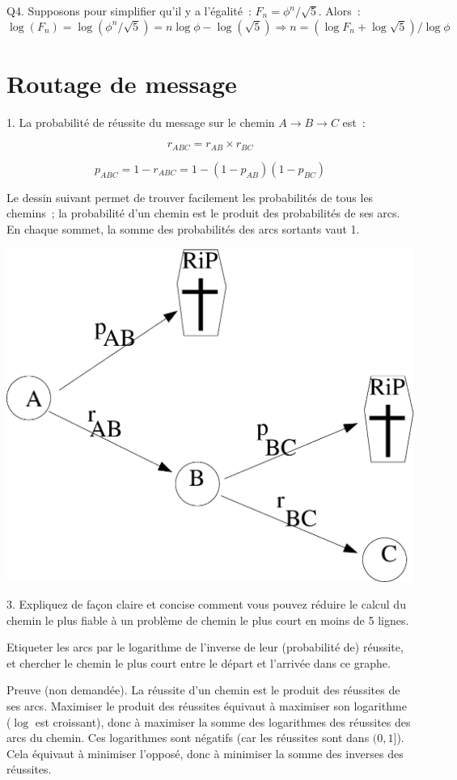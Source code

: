 \documentclass[11pt]{article}
\begin{document}
Q4. Supposons pour simplifier qu'il y a l'égalité~: $F_n = \phi^n / \sqrt{5}$. Alors~: $$\log( F_n) = \log(\phi^n / \sqrt{5}) = n \log\phi - \log(\sqrt{5}) \Rightarrow  n= (\log F_n+\log\sqrt{5})/\log\phi   $$ 

\section{Routage de message}


1. La probabilité  de réussite du message sur le chemin $A \rightarrow B \rightarrow C$ est~:

$$r_{ABC} = r_{AB} \times r_{BC}$$ 

$$p_{ABC}= 1 - r_{ABC}=1 - (1-p_{AB})(1-p_{BC})$$

Le dessin suivant permet de trouver facilement les probabilités de tous les chemins~; la probabilité d'un chemin est le produit des probabilités de ses arcs.
En chaque sommet, la somme des probabilités des arcs sortants vaut 1.

\begin{center}
\includegraphics[width=0.5\linewidth]{ABC.eps}
\end{center}

3. Expliquez de façon claire et concise
comment vous pouvez réduire le calcul du chemin le plus fiable à un problème de chemin le plus court en moins de 5 lignes.

Etiqueter les arcs par le logarithme de l'inverse de leur (probabilité de) réussite, et chercher le chemin le plus court entre le départ et l'arrivée dans ce graphe.

Preuve (non demandée). La réussite d'un chemin est le produit des réussites de ses arcs. Maximiser le produit des réussites équivaut à maximiser son logarithme ($\log$ est  croissant), donc à maximiser la somme des logarithmes des réussites des  arcs du chemin. Ces logarithmes sont négatifs (car les réussites sont dans $(0, 1]$). Cela équivaut à minimiser l'opposé, donc à minimiser la somme des inverses des réussites.
\end{document}
